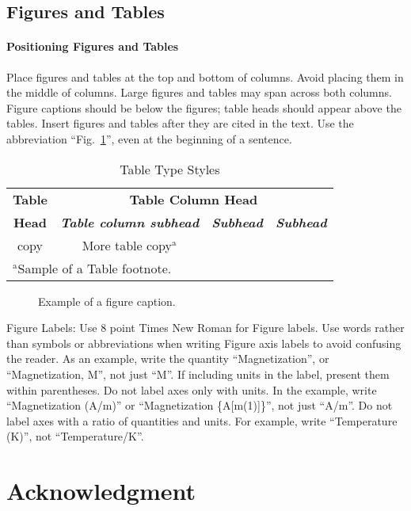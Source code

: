 \documentclass[conference]{IEEEtran}
\begin{document}
\subsection{Figures and Tables}
\paragraph{Positioning Figures and Tables} Place figures and tables at the top and 
bottom of columns. Avoid placing them in the middle of columns. Large 
figures and tables may span across both columns. Figure captions should be 
below the figures; table heads should appear above the tables. Insert 
figures and tables after they are cited in the text. Use the abbreviation 
``Fig.~\ref{fig}'', even at the beginning of a sentence.

\begin{table}[htbp]
\caption{Table Type Styles}
\begin{center}
\begin{tabular}{|c|c|c|c|}
\hline
\textbf{Table}&\multicolumn{3}{|c|}{\textbf{Table Column Head}} \\
\cline{2-4} 
\textbf{Head} & \textbf{\textit{Table column subhead}}& \textbf{\textit{Subhead}}& \textbf{\textit{Subhead}} \\
\hline
copy& More table copy$^{\mathrm{a}}$& &  \\
\hline
\multicolumn{4}{l}{$^{\mathrm{a}}$Sample of a Table footnote.}
\end{tabular}
\label{tab1}
\end{center}
\end{table}

\begin{figure}[htbp]

\caption{Example of a figure caption.}
\label{fig}
\end{figure}

Figure Labels: Use 8 point Times New Roman for Figure labels. Use words 
rather than symbols or abbreviations when writing Figure axis labels to 
avoid confusing the reader. As an example, write the quantity 
``Magnetization'', or ``Magnetization, M'', not just ``M''. If including 
units in the label, present them within parentheses. Do not label axes only 
with units. In the example, write ``Magnetization (A/m)'' or ``Magnetization 
\{A[m(1)]\}'', not just ``A/m''. Do not label axes with a ratio of 
quantities and units. For example, write ``Temperature (K)'', not 
``Temperature/K''.

\section*{Acknowledgment}
\end{document}
